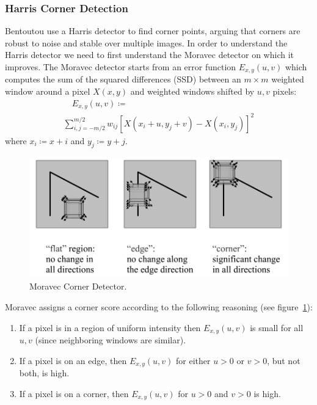 \subsubsection{Harris Corner Detection}
Bentoutou \etal \cite{bentoutou2005automatic} use a Harris detector \cite{harris1988combined} to find corner points, arguing that corners are robust to noise and stable over multiple images.
%
In order to understand the Harris detector we need to first understand the Moravec \cite{moravec1980obstacle} detector on which it improves.
%
The Moravec detector starts from an error function \(E_{x,y}(u,v)\) which computes the sum of the squared differences (SSD) between an \(m \times m\) weighted window around a pixel \(X(x, y)\) and weighted windows shifted by \(u,v\) pixels:
\begin{multline}
	\quad E_{x,y}(u,v) \coloneqq \\ \sum_{i,j=-m/2}^{m/2} w_{ij}\left[ X(x_i+ u,y_j+v) - X(x_i, y_j)\right]^2
	\label{moravecerrorfunction}
\end{multline}
where \(x_i \coloneqq x + i\) and \(y_j \coloneqq y+j\).
\begin{figure}[!htbp]
	\centering
	\includegraphics[width=\linewidth,keepaspectratio]{figures/registration/corners.png}
	\caption{Moravec Corner Detector.}
	\label{fig:corners}
\end{figure}
Moravec assigns a corner score according to the following reasoning (see figure~\ref{fig:corners}):
\begin{framed}
	\begin{enumerate}
		\item If a pixel is in a region of uniform intensity then \(E_{x,y}(u,v)\) is small for all \(u,v\) (since neighboring windows are similar).
		\item If a pixel is on an edge, then \(E_{x,y}(u,v)\) for either \(u > 0\) or \(v > 0\), but not both, is high.
		\item If a pixel is on a corner, then \(E_{x,y}(u,v)\) for \(u > 0\) and \(v > 0\) is high.
	\end{enumerate}
\end{framed}
